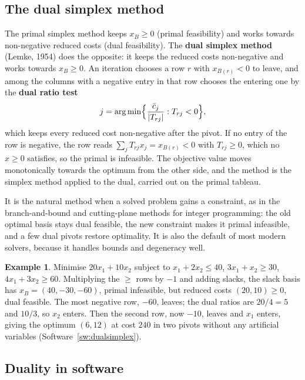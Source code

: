 \documentclass[11pt,a4paper]{article}
\numberwithin{equation}{section}
\theoremstyle{definition}
\newtheorem{exa}[thm]{Example}
\begin{document}
\subsection{The dual simplex method}
\label{ssec:dualsimplex}

The primal simplex method keeps $x_B \geq 0$ (primal feasibility) and works towards non-negative reduced costs (dual feasibility). The \textbf{dual simplex method} (Lemke, 1954) does the opposite: it keeps the reduced costs non-negative and works towards $x_B \geq 0$. An iteration chooses a row $r$ with
$x_{B(r)} < 0$ to leave, and among the columns with a negative entry in that row chooses the entering one by the \textbf{dual ratio test}
\[
j = \operatorname*{arg\,min}\Bigl\{\frac{\bar c_j}{|T_{rj}|} : T_{rj} < 0\Bigr\} ,
\]
which keeps every reduced cost non-negative after the pivot. If no entry of the row is negative, the row reads $\sum_jT_{rj}x_j = x_{B(r)} < 0$ with $T_{rj} \geq 0$, which no $x \geq 0$ satisfies, so the primal is infeasible. The objective value moves monotonically towards the optimum from the other side, and the method is the
simplex method applied to the dual, carried out on the primal tableau.

It is the natural method when a solved problem gains a constraint, as in the branch-and-bound and cutting-plane methods for integer programming: the old optimal basis stays dual feasible, the new constraint makes it primal infeasible, and a few dual pivots restore optimality. It is also the default of most modern solvers,
because it handles bounds and degeneracy well.

\begin{exa}
\label{ex:dualsimplex}
Minimise $20x_1 + 10x_2$ subject to $x_1 + 2x_2 \leq 40$, $3x_1 + x_2 \geq 30$, $4x_1 + 3x_2 \geq 60$. Multiplying the $\geq$ rows by $-1$ and adding slacks, the slack basis has $x_B = (40, -30, -60)$, primal infeasible, but reduced costs $(20, 10) \geq 0$, dual feasible. The most negative row, $-60$,
leaves; the dual ratios are $20/4 = 5$ and $10/3$, so $x_2$ enters. Then the second row, now $-10$, leaves and $x_1$ enters, giving the optimum $(6, 12)$ at cost $240$ in two pivots without any artificial variables (Software~\ref{sw:dualsimplex}).
\end{exa}

\subsection{Duality in software}
\label{ssec:software5}
\end{document}
